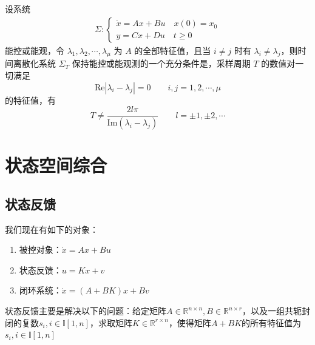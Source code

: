 \begin{theorem}
    设系统
    \begin{gather*}
        \Sigma:\begin{cases}
            \dot{x} = A x + B u \quad x(0) = x_0 \\
            y = C x + D u \quad t \geq 0
        \end{cases}
    \end{gather*}
    能控或能观，令 $\lambda_1, \lambda_2, \cdots, \lambda_\mu$ 为 $A$ 的全部特征值，且当 $i \neq j$ 时有 $\lambda_i \neq \lambda_j$，则时间离散化系统 $\Sigma_T$ 保持能控或能观测的一个充分条件是，采样周期 $T$ 的数值对一切满足
    \begin{equation*}
        \mathrm{Re}|\lambda_i - \lambda_j| = 0 \qquad i, j = 1, 2, \cdots, \mu
    \end{equation*}
    的特征值，有
    \begin{equation*}
        T \neq \frac{2l\pi}{\mathrm{Im}(\lambda_i - \lambda_j)} \qquad l = \pm 1, \pm 2, \cdots
    \end{equation*}
\end{theorem}

\section{状态空间综合}

\subsection{状态反馈}

我们现在有如下的对象：
\begin{enumerate}
    \item 被控对象：$\dot{x} = Ax + Bu$
    \item 状态反馈：$u = K x + v$
    \item 闭环系统：$\dot{x} = (A+BK) x + B v$
\end{enumerate}

状态反馈主要是解决以下的问题：给定矩阵$A \in \mathbb{R}^{n \times n},B\in \mathbb{R}^{n \times r}$，以及一组共轭封闭的复数$s_i,i\in \mathbb{I}[1,n]$，求取矩阵$K\in \mathbb{R}^{r \times n}$，使得矩阵$A+BK$的所有特征值为$s_i,i\in \mathbb{I}[1,n]$

